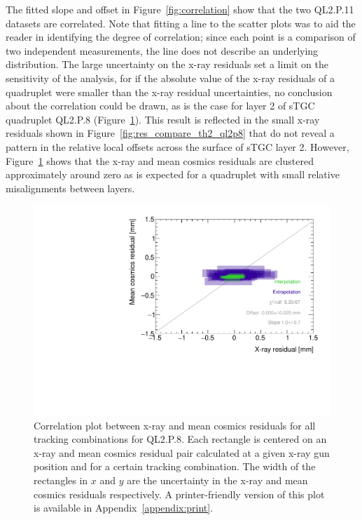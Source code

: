 The fitted slope and offset in Figure~\ref{fig:correlation} show that the two QL2.P.11 datasets are correlated. Note that fitting a line to the scatter plots was to aid the reader in identifying the degree of correlation; since each point is a comparison of two independent measurements, the line does not describe an underlying distribution. The large uncertainty on the x-ray residuals set a limit on the sensitivity of the analysis, for if the absolute value of the x-ray residuals of a quadruplet were smaller than the x-ray residual uncertainties, no conclusion about the correlation could be drawn, as is the case for layer 2 of sTGC quadruplet QL2.P.8 (Figure~\ref{fig:no_correlation}). This result is reflected in the small x-ray residuals shown in Figure~\ref{fig:res_compare_th2_ql2p8} that do not reveal a pattern in the relative local offsets across the surface of sTGC layer 2. However, Figure~\ref{fig:no_correlation} shows that the x-ray and mean cosmics residuals are clustered approximately around zero as is expected for a quadruplet with small relative misalignments between layers. 
\begin{figure}
    \centering
    \includegraphics[width = \textwidth]{figures/figure_QL2P08_3100V_2021-08-16_QL2P08_local_cosmic_and_xray_data_correlation_plot.pdf}
    \caption{Correlation plot between x-ray and mean cosmics residuals for all tracking combinations for QL2.P.8. Each rectangle is centered on an x-ray and mean cosmics residual pair calculated at a given x-ray gun position and for a certain tracking combination. The width of the rectangles in $x$ and $y$ are the uncertainty in the x-ray and mean cosmics residuals respectively. A printer-friendly version of this plot is available in Appendix~\ref{appendix:print}.}
    \label{fig:no_correlation}
\end{figure}

